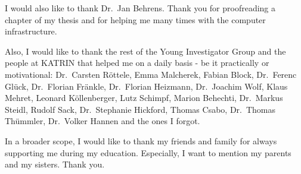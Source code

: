 I would also like to thank Dr.~Jan Behrens. Thank you for proofreading a chapter of my thesis and for helping me many times with the computer infrastructure.


Also, I would like to thank the rest of the Young Investigator Group and the people at KATRIN that helped me on a daily basis - be it practically or motivational: 
Dr.~Carsten Röttele, 
Emma Malcherek, 
Fabian Block, Dr.~Ferenc Glück, Dr.~Florian Fränkle, Dr.~Florian Heizmann,
Dr.~Joachim Wolf,
Klaus Mehret,
Leonard Köllenberger, Lutz Schimpf,
Marion Behechti, Dr.~Markus Steidl,
Rudolf Sack,
Dr.~Stephanie Hickford, 
Thomas Csabo, Dr.~Thomas Thümmler,  
Dr.~Volker Hannen 
and the ones I forgot. 


In a broader scope, I would like to thank my friends and family for always supporting me during my education. Especially, I want to mention my parents and my sisters. Thank you.